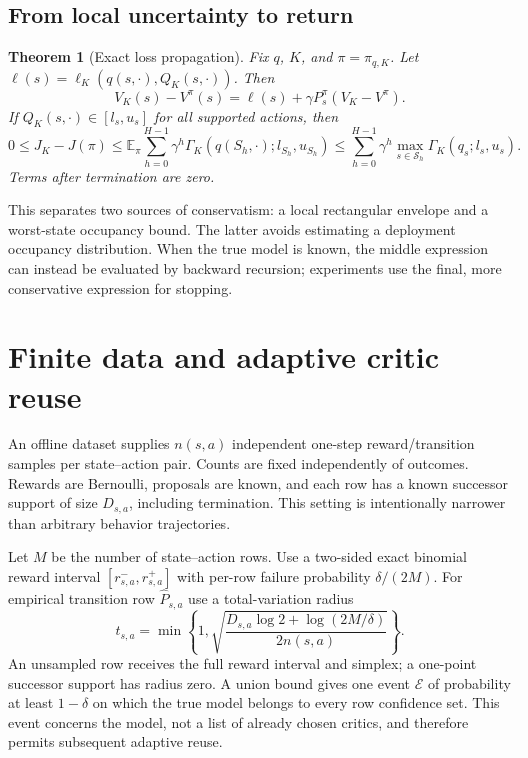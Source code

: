\documentclass[11pt]{article}
\newtheorem{theorem}{Theorem}
\newcommand{\E}{\mathbb E}\newcommand{\Prb}{\mathbb P}\newcommand{\R}{\mathbb R}
\begin{document}
\subsection{From local uncertainty to return}
\begin{theorem}[Exact loss propagation]\label{thm:performance}
Fix $q$, $K$, and $\pi=\pi_{q,K}$. Let $\ell(s)=\ell_K(q(s,\cdot),Q_K(s,\cdot))$. Then
\begin{equation}
 V_K(s)-V^\pi(s)=\ell(s)+\gamma P^\pi_s(V_K-V^\pi).
 \label{eq:resolvent}
\end{equation}
If $Q_K(s,\cdot)\in[l_s,u_s]$ for all supported actions, then
\begin{equation}
 0\le J_K-J(\pi)\le
 \E_\pi\sum_{h=0}^{H-1}\gamma^h\Gamma_K(q(S_h,\cdot);l_{S_h},u_{S_h})
 \le\sum_{h=0}^{H-1}\gamma^h\max_{s\in\mathcal S_h}\Gamma_K(q_s;l_s,u_s).
 \label{eq:performance}
\end{equation}
Terms after termination are zero.
\end{theorem}
This separates two sources of conservatism: a local rectangular envelope and a worst-state occupancy bound. The latter avoids estimating a deployment occupancy distribution. When the true model is known, the middle expression can instead be evaluated by backward recursion; experiments use the final, more conservative expression for stopping.

\section{Finite data and adaptive critic reuse}
An offline dataset supplies $n(s,a)$ independent one-step reward/transition samples per state--action pair. Counts are fixed independently of outcomes. Rewards are Bernoulli, proposals are known, and each row has a known successor support of size $D_{s,a}$, including termination. This setting is intentionally narrower than arbitrary behavior trajectories.

Let $M$ be the number of state--action rows. Use a two-sided exact binomial reward interval $[r^-_{s,a},r^+_{s,a}]$ with per-row failure probability $\delta/(2M)$. For empirical transition row $\widehat P_{s,a}$ use a total-variation radius
\begin{equation}
 t_{s,a}=\min\left\{1,\sqrt{\frac{D_{s,a}\log 2+\log(2M/\delta)}{2n(s,a)}}\right\}.
 \label{eq:tv-radius}
\end{equation}
An unsampled row receives the full reward interval and simplex; a one-point successor support has radius zero. A union bound gives one event $\mathcal E$ of probability at least $1-\delta$ on which the true model belongs to every row confidence set. This event concerns the model, not a list of already chosen critics, and therefore permits subsequent adaptive reuse.
\end{document}
